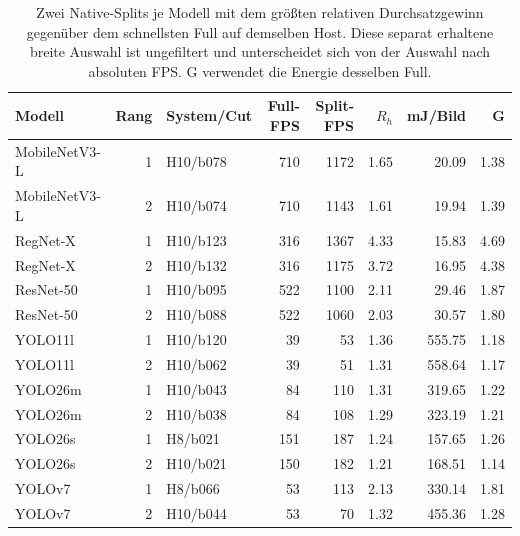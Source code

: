 \begin{table}[t]
\centering
\caption{Zwei Native-Splits je Modell mit dem größten relativen Durchsatzgewinn gegenüber dem schnellsten Full auf demselben Host. Diese separat erhaltene breite Auswahl ist ungefiltert und unterscheidet sich von der Auswahl nach absoluten FPS. G verwendet die Energie desselben Full.}
\label{tab:current-top2-relative}
\begingroup\small\setlength{\tabcolsep}{3pt}
\begin{tabular*}{\textwidth}{@{\extracolsep{\fill}}l r l r r r r r@{}}
\toprule
Modell & Rang & System/Cut & Full-FPS & Split-FPS & $R_{h}$ & mJ/Bild & G \\
\midrule
MobileNetV3-L & 1 & H10/b078 & 710 & 1172 & 1.65 & 20.09 & 1.38 \\
MobileNetV3-L & 2 & H10/b074 & 710 & 1143 & 1.61 & 19.94 & 1.39 \\
RegNet-X & 1 & H10/b123 & 316 & 1367 & 4.33 & 15.83 & 4.69 \\
RegNet-X & 2 & H10/b132 & 316 & 1175 & 3.72 & 16.95 & 4.38 \\
ResNet-50 & 1 & H10/b095 & 522 & 1100 & 2.11 & 29.46 & 1.87 \\
ResNet-50 & 2 & H10/b088 & 522 & 1060 & 2.03 & 30.57 & 1.80 \\
YOLO11l & 1 & H10/b120 & 39 & 53 & 1.36 & 555.75 & 1.18 \\
YOLO11l & 2 & H10/b062 & 39 & 51 & 1.31 & 558.64 & 1.17 \\
YOLO26m & 1 & H10/b043 & 84 & 110 & 1.31 & 319.65 & 1.22 \\
YOLO26m & 2 & H10/b038 & 84 & 108 & 1.29 & 323.19 & 1.21 \\
YOLO26s & 1 & H8/b021 & 151 & 187 & 1.24 & 157.65 & 1.26 \\
YOLO26s & 2 & H10/b021 & 150 & 182 & 1.21 & 168.51 & 1.14 \\
YOLOv7 & 1 & H8/b066 & 53 & 113 & 2.13 & 330.14 & 1.81 \\
YOLOv7 & 2 & H10/b044 & 53 & 70 & 1.32 & 455.36 & 1.28 \\
\bottomrule
\end{tabular*}
\endgroup
\end{table}
